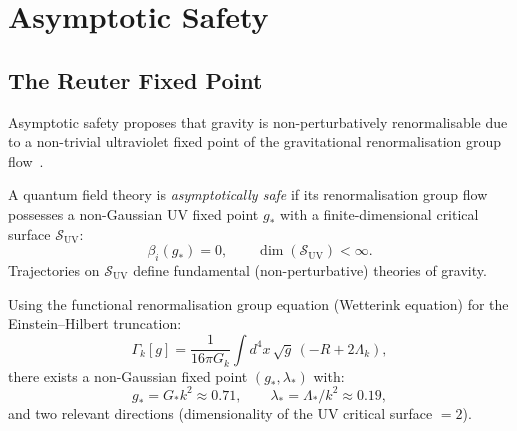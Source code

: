 \section{Asymptotic Safety}
\label{sec:asymptotic_safety}

\subsection{The Reuter Fixed Point}

Asymptotic safety proposes that gravity is non-perturbatively
renormalisable due to a non-trivial ultraviolet fixed point of the
gravitational renormalisation group
flow~\cite{reuter1998nonperturbative}.

\begin{definition}
\label{def:asymptotic_safety}
A quantum field theory is \emph{asymptotically safe} if its
renormalisation group flow possesses a non-Gaussian UV fixed point
$g_*$ with a finite-dimensional critical surface $\mathcal{S}_{\mathrm{UV}}$:
\begin{equation}
\beta_i(g_*) = 0, \qquad
\dim(\mathcal{S}_{\mathrm{UV}}) < \infty.
\end{equation}
Trajectories on $\mathcal{S}_{\mathrm{UV}}$ define fundamental
(non-perturbative) theories of gravity.
\end{definition}

\begin{theorem}
\label{thm:reuter_fp}
Using the functional renormalisation group equation (Wetterink equation)
for the Einstein--Hilbert truncation:
\begin{equation}
\Gamma_k[g] = \frac{1}{16\pi G_k} \int d^4x\, \sqrt{g}\,
(-R + 2\Lambda_k),
\end{equation}
there exists a non-Gaussian fixed point $(g_*, \lambda_*)$ with:
\begin{equation}
g_* = G_* k^2 \approx 0.71, \qquad
\lambda_* = \Lambda_* / k^2 \approx 0.19,
\end{equation}
and two relevant directions (dimensionality of the UV critical surface
$= 2$).
\end{theorem}

